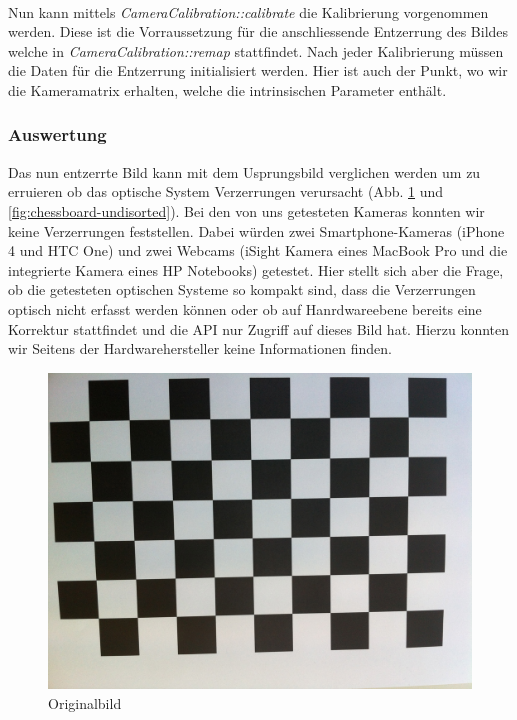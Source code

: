\documentclass[main.tex]{subfiles}
\begin{document}
\paragraph{} Nun kann mittels \textit{CameraCalibration::calibrate} die Kalibrierung vorgenommen werden. Diese ist die Vorraussetzung für die anschliessende Entzerrung des Bildes welche in \textit{CameraCalibration::remap} stattfindet. Nach jeder Kalibrierung müssen die Daten für die Entzerrung initialisiert werden. Hier ist auch der Punkt, wo wir die Kameramatrix erhalten, welche die intrinsischen Parameter enthält.

\subsubsection{Auswertung} Das nun entzerrte Bild kann mit dem Usprungsbild verglichen werden um zu erruieren ob das optische System Verzerrungen verursacht (Abb. \ref{fig:chessboard-disorted} und \ref{fig:chessboard-undisorted}). Bei den von uns getesteten Kameras konnten wir keine Verzerrungen feststellen. Dabei würden zwei Smartphone-Kameras (iPhone 4 und HTC One) und zwei Webcams (iSight Kamera eines MacBook Pro und die integrierte Kamera eines HP Notebooks) getestet. Hier stellt sich aber die Frage, ob die getesteten optischen Systeme so kompakt sind, dass die Verzerrungen optisch nicht erfasst werden können oder ob auf Hanrdwareebene bereits eine Korrektur stattfindet und die API nur Zugriff auf dieses Bild hat. Hierzu konnten wir Seitens der Hardwarehersteller keine Informationen finden.

\begin{figure}[!ht]
\centering
\includegraphics[scale=0.1]{images/chessboard-disorted.jpg} 
\caption{Originalbild}
\label{fig:chessboard-disorted}
\end{figure}
\end{document}
